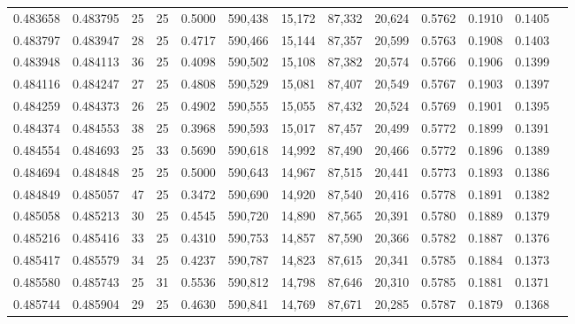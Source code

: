 \begin{tabular}{rrrrrrrrrrrrr}
0.483658 & 0.483795 &    25 &  25 &                                     0.5000 & 590,438 &  15,172 &  87,332 &  20,624 & 0.5762 & 0.1910 & 0.1405 \\
0.483797 & 0.483947 &    28 &  25 &                                     0.4717 & 590,466 &  15,144 &  87,357 &  20,599 & 0.5763 & 0.1908 & 0.1403 \\
0.483948 & 0.484113 &    36 &  25 &                                     0.4098 & 590,502 &  15,108 &  87,382 &  20,574 & 0.5766 & 0.1906 & 0.1399 \\
0.484116 & 0.484247 &    27 &  25 &                                     0.4808 & 590,529 &  15,081 &  87,407 &  20,549 & 0.5767 & 0.1903 & 0.1397 \\
0.484259 & 0.484373 &    26 &  25 &                                     0.4902 & 590,555 &  15,055 &  87,432 &  20,524 & 0.5769 & 0.1901 & 0.1395 \\
0.484374 & 0.484553 &    38 &  25 &                                     0.3968 & 590,593 &  15,017 &  87,457 &  20,499 & 0.5772 & 0.1899 & 0.1391 \\
0.484554 & 0.484693 &    25 &  33 &                                     0.5690 & 590,618 &  14,992 &  87,490 &  20,466 & 0.5772 & 0.1896 & 0.1389 \\
0.484694 & 0.484848 &    25 &  25 &                                     0.5000 & 590,643 &  14,967 &  87,515 &  20,441 & 0.5773 & 0.1893 & 0.1386 \\
0.484849 & 0.485057 &    47 &  25 &                                     0.3472 & 590,690 &  14,920 &  87,540 &  20,416 & 0.5778 & 0.1891 & 0.1382 \\
0.485058 & 0.485213 &    30 &  25 &                                     0.4545 & 590,720 &  14,890 &  87,565 &  20,391 & 0.5780 & 0.1889 & 0.1379 \\
0.485216 & 0.485416 &    33 &  25 &                                     0.4310 & 590,753 &  14,857 &  87,590 &  20,366 & 0.5782 & 0.1887 & 0.1376 \\
0.485417 & 0.485579 &    34 &  25 &                                     0.4237 & 590,787 &  14,823 &  87,615 &  20,341 & 0.5785 & 0.1884 & 0.1373 \\
0.485580 & 0.485743 &    25 &  31 &                                     0.5536 & 590,812 &  14,798 &  87,646 &  20,310 & 0.5785 & 0.1881 & 0.1371 \\
0.485744 & 0.485904 &    29 &  25 &                                     0.4630 & 590,841 &  14,769 &  87,671 &  20,285 & 0.5787 & 0.1879 & 0.1368 \\

\end{tabular}
